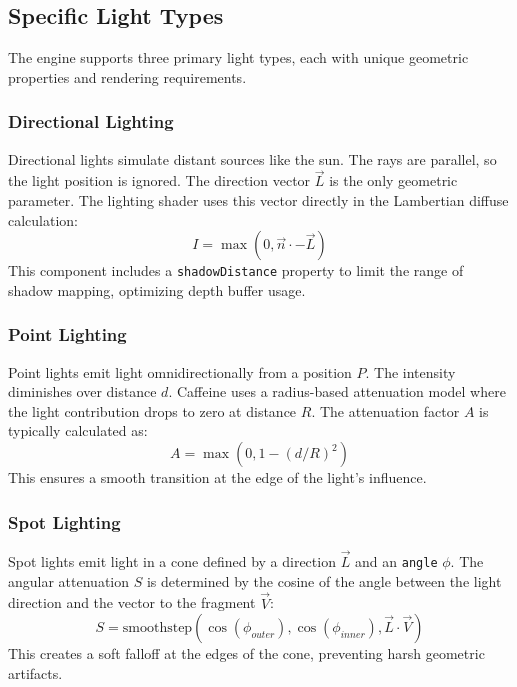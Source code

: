 \subsection{Specific Light Types}

The engine supports three primary light types, each with unique geometric properties and rendering requirements.

\subsubsection{Directional Lighting}
Directional lights simulate distant sources like the sun. The rays are parallel, so the light position is ignored. The direction vector $\vec{L}$ is the only geometric parameter. The lighting shader uses this vector directly in the Lambertian diffuse calculation:
\begin{equation}
    I = \max(0, \vec{n} \cdot -\vec{L})
\end{equation}
This component includes a \texttt{shadowDistance} property to limit the range of shadow mapping, optimizing depth buffer usage.

\subsubsection{Point Lighting}
Point lights emit light omnidirectionally from a position $P$. The intensity diminishes over distance $d$. Caffeine uses a radius-based attenuation model where the light contribution drops to zero at distance $R$. The attenuation factor $A$ is typically calculated as:
\begin{equation}
    A = \max(0, 1 - (d/R)^2)
\end{equation}
This ensures a smooth transition at the edge of the light's influence.

\subsubsection{Spot Lighting}
Spot lights emit light in a cone defined by a direction $\vec{L}$ and an \texttt{angle} $\phi$. The angular attenuation $S$ is determined by the cosine of the angle between the light direction and the vector to the fragment $\vec{V}$:
\begin{equation}
    S = \text{smoothstep}(\cos(\phi_{outer}), \cos(\phi_{inner}), \vec{L} \cdot \vec{V})
\end{equation}
This creates a soft falloff at the edges of the cone, preventing harsh geometric artifacts.

